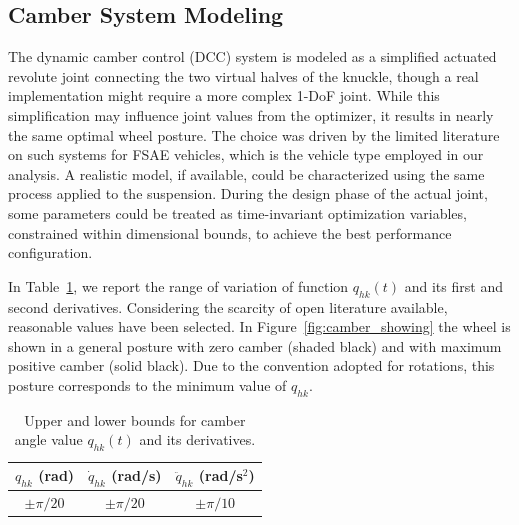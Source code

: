 \subsection{Camber System Modeling}
\label{sec:cambersystemmodeling}
The dynamic camber control (DCC) system is modeled as a simplified actuated revolute joint connecting the two virtual halves of the knuckle, though a real implementation might require a more complex 1-DoF joint. While this simplification may influence joint values from the optimizer, it results in nearly the same optimal wheel posture. The choice was driven by the limited literature on such systems for FSAE vehicles, which is the vehicle type employed in our analysis. A realistic model, if available, could be characterized using the same process applied to the suspension. During the design phase of the actual joint, some parameters could be treated as time-invariant optimization variables, constrained within dimensional bounds, to achieve the best performance configuration.

In Table~\ref{tab:camber_prop}, we report the range of variation of function $q_{hk}(t)$ and its first and second derivatives. Considering the scarcity of open literature available, reasonable values have been selected. In Figure~\ref{fig:camber_showing} the wheel is shown in a general posture with zero camber (shaded black) and with maximum positive camber (solid black). Due to the convention adopted for rotations, this posture corresponds to the minimum value of $q_{hk}$.
\begin{table}[h]
	\centering
	\begin{tabular}{|c|c|c|}
		\hline
		$q_{hk}$ (rad) & $\dot{q}_{hk}$ (rad/s)& $\ddot{q}_{hk}$ (rad/s$^2$)\\\hline
		$\pm \pi/20$ & $\pm \pi/20$ & $\pm \pi/10$ \\\hline
	\end{tabular}
	\caption{Upper and lower bounds for camber angle value $q_{hk}(t)$ and its derivatives.}
	\label{tab:camber_prop}
\end{table}

